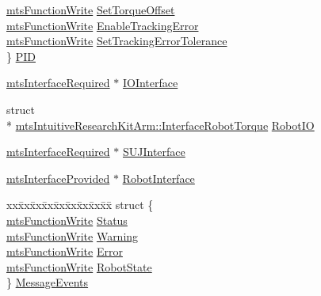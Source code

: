 \begin{DoxyCompactItemize}
\begin{tabbing}
\>\hyperlink{classmts_function_write}{mtsFunctionWrite} \hyperlink{classmts_intuitive_research_kit_arm_a438ad77dd476331ccb13493748867f14}{SetTorqueOffset}\\
\>\hyperlink{classmts_function_write}{mtsFunctionWrite} \hyperlink{classmts_intuitive_research_kit_arm_a2ed47460f12089dd60ee5c9eb995781b}{EnableTrackingError}\\
\>\hyperlink{classmts_function_write}{mtsFunctionWrite} \hyperlink{classmts_intuitive_research_kit_arm_aa8702bf5242408d810c3b894e7ad3f3f}{SetTrackingErrorTolerance}\\
\} \hyperlink{classmts_intuitive_research_kit_arm_a91357b5b94117db043c5deecd3a7c16e}{PID}\\

\end{tabbing}\item 
\hyperlink{classmts_interface_required}{mts\-Interface\-Required} $\ast$ \hyperlink{classmts_intuitive_research_kit_arm_af0ea596cde18d92b25eb0b1a5e53ccc3}{I\-O\-Interface}
\item 
struct \\*
\hyperlink{structmts_intuitive_research_kit_arm_1_1_interface_robot_torque}{mts\-Intuitive\-Research\-Kit\-Arm\-::\-Interface\-Robot\-Torque} \hyperlink{classmts_intuitive_research_kit_arm_a7112330e6775316517c28a94a116294b}{Robot\-I\-O}
\item 
\hyperlink{classmts_interface_required}{mts\-Interface\-Required} $\ast$ \hyperlink{classmts_intuitive_research_kit_arm_adc1ca72351965ff611fcf889d20d92c9}{S\-U\-J\-Interface}
\item 
\hyperlink{classmts_interface_provided}{mts\-Interface\-Provided} $\ast$ \hyperlink{classmts_intuitive_research_kit_arm_a1d8e3354259059e9cc8255a8038b5fc1}{Robot\-Interface}
\item 
\begin{tabbing}
xx\=xx\=xx\=xx\=xx\=xx\=xx\=xx\=xx\=\kill
struct \{\\
\>\hyperlink{classmts_function_write}{mtsFunctionWrite} \hyperlink{classmts_intuitive_research_kit_arm_ab619a130261fd4497623b575a90da1b1}{Status}\\
\>\hyperlink{classmts_function_write}{mtsFunctionWrite} \hyperlink{classmts_intuitive_research_kit_arm_a1fd3779c8e6c205523e852df2c3e9172}{Warning}\\
\>\hyperlink{classmts_function_write}{mtsFunctionWrite} \hyperlink{classmts_intuitive_research_kit_arm_aff0e68aa4882d7765927c00a7f434c9d}{Error}\\
\>\hyperlink{classmts_function_write}{mtsFunctionWrite} \hyperlink{classmts_intuitive_research_kit_arm_adc07772d73f425b2a9222deb4d8767d1}{RobotState}\\
\} \hyperlink{classmts_intuitive_research_kit_arm_a75a1505ab3a1111950ac2b8df44710c2}{MessageEvents}\\


\end{tabbing}
\end{DoxyCompactItemize}
